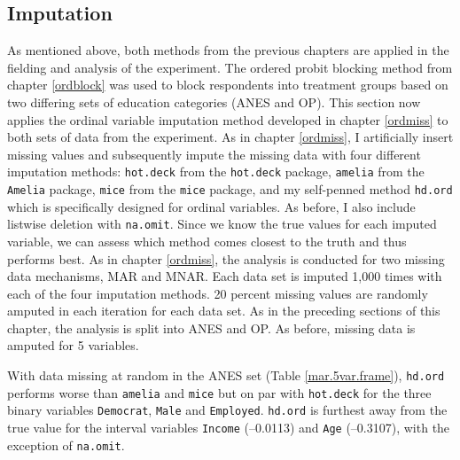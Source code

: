 \documentclass[12pt,econ]{sources/authesis}
\begin{document}
\hypertarget{framing-results-experiment-imputation}{%
\subsection{Imputation}\label{framing-results-experiment-imputation}}

\vspace{-9cm}

As mentioned above, both methods from the previous chapters are applied in the fielding and analysis of the experiment. The ordered probit blocking method from chapter \ref{ordblock} was used to block respondents into treatment groups based on two differing sets of education categories (ANES and OP). This section now applies the ordinal variable imputation method developed in chapter \ref{ordmiss} to both sets of data from the experiment. As in chapter \ref{ordmiss}, I artificially insert missing values and subsequently impute the missing data with four different imputation methods: \texttt{hot.deck} from the \texttt{hot.deck} package, \texttt{amelia} from the \texttt{Amelia} package, \texttt{mice} from the \texttt{mice} package, and my self-penned method \texttt{hd.ord} which is specifically designed for ordinal variables. As before, I also include listwise deletion with \texttt{na.omit}. Since we know the true values for each imputed variable, we can assess which method comes closest to the truth and thus performs best. As in chapter \ref{ordmiss}, the analysis is conducted for two missing data mechanisms, MAR and MNAR. Each data set is imputed 1,000 times with each of the four imputation methods. 20 percent missing values are randomly amputed in each iteration for each data set. As in the preceding sections of this chapter, the analysis is split into ANES and OP. As before, missing data is amputed for 5 variables.

With data missing at random in the ANES set (Table \ref{mar.5var.frame}), \texttt{hd.ord} performs worse than \texttt{amelia} and \texttt{mice} but on par with \texttt{hot.deck} for the three binary variables \texttt{Democrat}, \texttt{Male} and \texttt{Employed}. \texttt{hd.ord} is furthest away from the true value for the interval variables \texttt{Income} (--0.0113) and \texttt{Age} (--0.3107), with the exception of \texttt{na.omit}.
\end{document}
